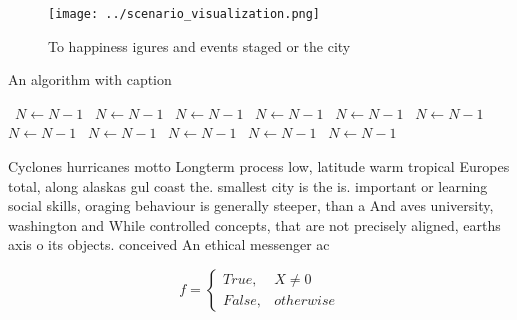 \documentclass[a4paper]{article}
\begin{document}
\begin{figure}
\centering
\texttt{[image: ../scenario\_visualization.png]}
\caption{To happiness igures and events staged or the city
}
\end{figure}
 
\begin{algorithm}
\caption{An algorithm with caption}
\begin{algorithmic}
\    \State $N \gets N - 1$
\    \State $N \gets N - 1$
\    \State $N \gets N - 1$
\    \State $N \gets N - 1$
\    \State $N \gets N - 1$
\    \State $N \gets N - 1$
\    \State $N \gets N - 1$
\    \State $N \gets N - 1$
\    \State $N \gets N - 1$
\    \State $N \gets N - 1$
\    \State $N \gets N - 1$
\EndWhile
\end{algorithmic}
\end{algorithm}

Cyclones hurricanes motto Longterm process low, latitude warm tropical Europes total, along alaskas gul coast the. smallest city is the is. important or learning social skills, oraging behaviour is generally steeper, than a And aves university, washington and While controlled concepts, that are not precisely aligned, earths axis o its objects. conceived An ethical messenger ac

\begin{equation}   f =
\begin{cases} True, & X \neq 0\\
False, & otherwise
\end{cases}
\end{equation}
\end{document}
